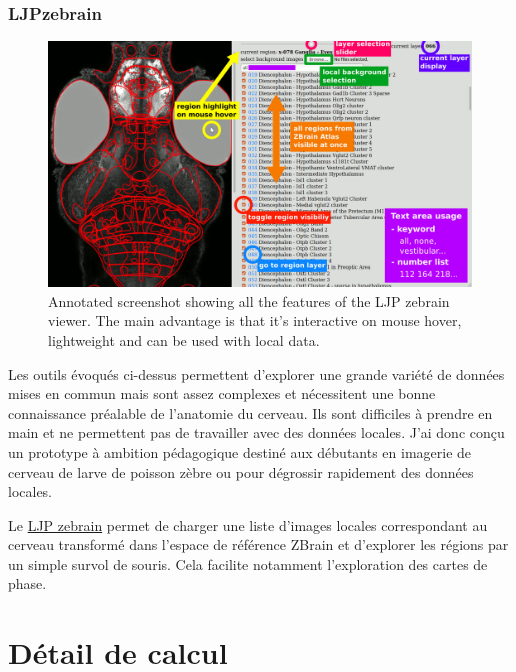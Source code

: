 \subsection{LJPzebrain}

\begin{figure}
\centering
\includegraphics[width=\textwidth]{./files/LJPzebrain_screenshot.png}
\caption{Annotated screenshot showing all the features of the LJP zebrain viewer. The main advantage is that it's interactive on mouse hover, lightweight and can be used with local data.}
\end{figure}

Les outils évoqués ci-dessus permettent d'explorer une grande variété de données mises en commun mais sont assez complexes et nécessitent une bonne connaissance préalable de l'anatomie du cerveau. Ils sont difficiles à prendre en main et ne permettent pas de travailler avec des données locales. J'ai donc conçu un prototype à ambition pédagogique destiné aux débutants en imagerie de cerveau de larve de poisson zèbre ou pour dégrossir rapidement des données locales.

Le \href{https://github.com/LJPZebra/zebrain}{LJP zebrain} permet de charger une liste d'images locales correspondant au cerveau transformé dans l'espace de référence ZBrain et d'explorer les régions par un simple survol de souris. Cela facilite notamment l'exploration des cartes de phase.










\chapter{Détail de calcul}\label{calculdetail}

